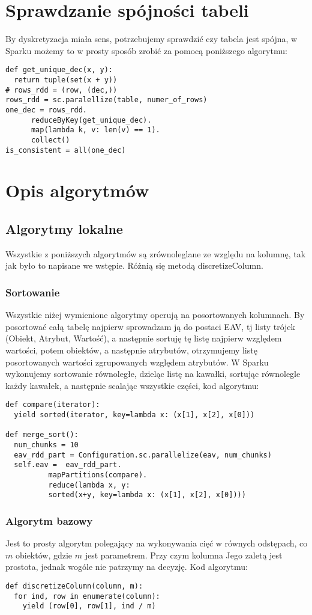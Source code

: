 \documentclass[magisterska]{pracamgr}
\theoremstyle{plain}
\theoremstyle{definition}
\theoremstyle{remark}
\begin{document}
\section{Sprawdzanie spójności tabeli}
By dyskretyzacja miała sens, potrzebujemy sprawdzić czy tabela jest spójna, w Sparku możemy 
to w prosty sposób zrobić za pomocą poniższego algorytmu:
\begin{lstlisting}[frame=single] 
def get_unique_dec(x, y):
  return tuple(set(x + y))
# rows_rdd = (row, (dec,))
rows_rdd = sc.paralellize(table, numer_of_rows)
one_dec = rows_rdd.
	  reduceByKey(get_unique_dec).
	  map(lambda k, v: len(v) == 1).
	  collect()
is_consistent = all(one_dec)
\end{lstlisting}
\section{Opis algorytmów}
\subsection{Algorytmy lokalne}
Wszystkie z poniższych algorytmów są zrównoleglane ze względu na kolumnę, tak 
jak było to napisane we wstępie. Różnią się metodą discretizeColumn.
\subsubsection{Sortowanie}
Wszystkie niżej wymienione algorytmy operują na posortowanych kolumnach. By posortować całą tabelę najpierw
sprowadzam ją do postaci EAV, tj listy trójek (Obiekt, Atrybut, Wartość), a następnie sortuję tę listę 
najpierw względem wartości, potem obiektów, a następnie atrybutów, otrzymujemy listę posortowanych wartości
zgrupowanych względem atrybutów. W Sparku wykonujemy sortowanie równoległe, dzieląc listę na kawałki, 
sortując równolegle każdy kawałek, a następnie scalając wszystkie części, kod algorytmu:
\begin{lstlisting}[frame=single]
def compare(iterator):
  yield sorted(iterator, key=lambda x: (x[1], x[2], x[0]))

def merge_sort():
  num_chunks = 10
  eav_rdd_part = Configuration.sc.parallelize(eav, num_chunks)
  self.eav =  eav_rdd_part.
	      mapPartitions(compare).
	      reduce(lambda x, y: 
	      sorted(x+y, key=lambda x: (x[1], x[2], x[0])))
\end{lstlisting}

\subsubsection{Algorytm bazowy}
Jest to prosty algorytm polegający na wykonywania cięć w równych odstępach, co $m$ obiektów, gdzie
$m$ jest parametrem. Przy czym kolumna 
Jego zaletą jest prostota, jednak wogóle nie patrzymy na decyzję.
Kod algorytmu:
\begin{lstlisting}[frame=single] 
def discretizeColumn(column, m):
  for ind, row in enumerate(column):
    yield (row[0], row[1], ind / m)
\end{lstlisting}
\end{document}
